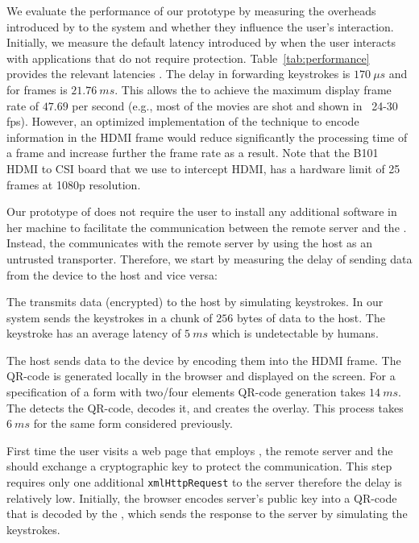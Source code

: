 We evaluate the performance of our prototype by measuring the overheads introduced by \name to the system and whether they influence the user's interaction. Initially, we measure the default latency introduced by \device when the user interacts with applications that do not require protection. Table~\ref{tab:performance} provides the relevant latencies .
The delay in forwarding keystrokes is $170\ \mu s$ and for frames is $21.76\ ms$. This allows the \device to achieve the maximum display frame rate of $47.69$ per second (e.g., most of the movies are shot and shown in  ~24-30 fps). However, an optimized implementation of the technique to encode information in the HDMI frame would reduce significantly the processing time of a frame and increase further the frame rate as a result. Note that the B101 HDMI to CSI board that we use to intercept HDMI, has a hardware limit of 25 frames at 1080p resolution.  

Our prototype of \name does not require the user to install any additional software in her machine to facilitate the communication between the remote server and the \device. Instead, the \device communicates with the remote server by using the host as an untrusted transporter. Therefore, we start by measuring the delay of sending data from the device to the host and vice versa:

\parasave
{} The \device transmits data (encrypted) to the host by simulating keystrokes. In our system \device sends the keystrokes in a chunk of $256$ bytes of data to the host. The keystroke has an average latency of $5\ ms$ which is undetectable by humans.  

\parasave
{} The host sends data to the device by encoding them into the HDMI frame. The QR-code is generated locally in the browser and displayed on the screen. For a specification of a form with two/four elements QR-code generation takes $14\ ms$. The \device detects the QR-code, decodes it, and creates the overlay. This process takes $6\ ms$ for the same form considered previously.
 

\parasave
{} First time the user visits a web page that employs \name, the remote server and the \device should exchange a cryptographic key to protect the communication. This step requires only one additional \texttt{xmlHttpRequest} to the server therefore the delay is relatively low. Initially, the browser encodes server's public key into a QR-code that is decoded by the \device, which sends the response to the server by simulating the keystrokes.


